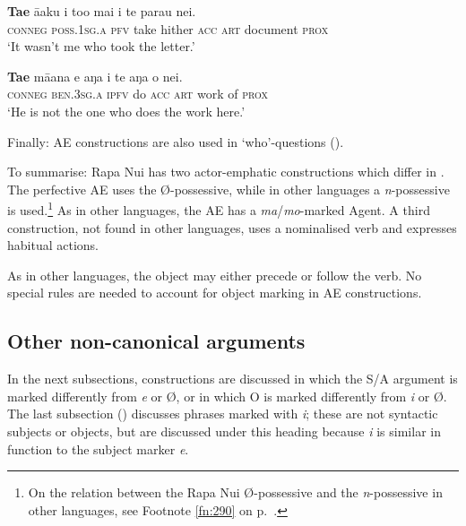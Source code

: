 \ea\label{ex:8.108}
\gll \textbf{Ta{\ꞌ}e} {\ꞌ}ā{\ꞌ}aku i to{\ꞌ}o mai i te parau nei.\\
\textsc{conneg} \textsc{poss.1sg.a} \textsc{pfv} take hither \textsc{acc} \textsc{art} document \textsc{prox}\\

\glt 
‘It wasn’t me who took the letter.’ \textstyleExampleref{[Egt-02.336]}
\z

\ea\label{ex:8.109}
\gll \textbf{Ta{\ꞌ}e} mā{\ꞌ}ana e aŋa i te aŋa o nei. \\
\textsc{conneg} \textsc{ben.3sg.a} \textsc{ipfv} do \textsc{acc} \textsc{art} work of \textsc{prox} \\

\glt
‘He is not the one who does the work here.’ \textstyleExampleref{[R229.462]} 
\z

Finally: AE constructions are also used in ‘who’-questions ().

To summarise: Rapa Nui has two actor-emphatic constructions which differ in . The perfective AE uses the Ø-possessive, while in other languages a \textit{n}{}-possessive is used.\footnote{\label{fn:431}On the relation between the Rapa Nui Ø-possessive and the \textit{n}{}-possessive in other languages, see Footnote \ref{fn:290} on p.~\pageref{fn:290}.} As in other languages, the  AE has a \textit{ma}/\textit{mo}{}-marked Agent. A third construction, not found in other languages, uses a nominalised verb and expresses habitual actions. 

As in other languages, the object may either precede or follow the verb. No special rules are needed to account for object marking in AE constructions. 
\subsection{Other non-canonical arguments}\label{sec:8.6.4}

In the next subsections, constructions are discussed in which the S/A argument is marked differently from \textit{e} or Ø, or in which O is marked differently from \textit{i} or Ø. The last subsection () discusses  phrases marked with \textit{i}; these are not syntactic subjects or objects, but are discussed under this heading because  \textit{i} is similar in function to the  subject marker \textit{e}.

